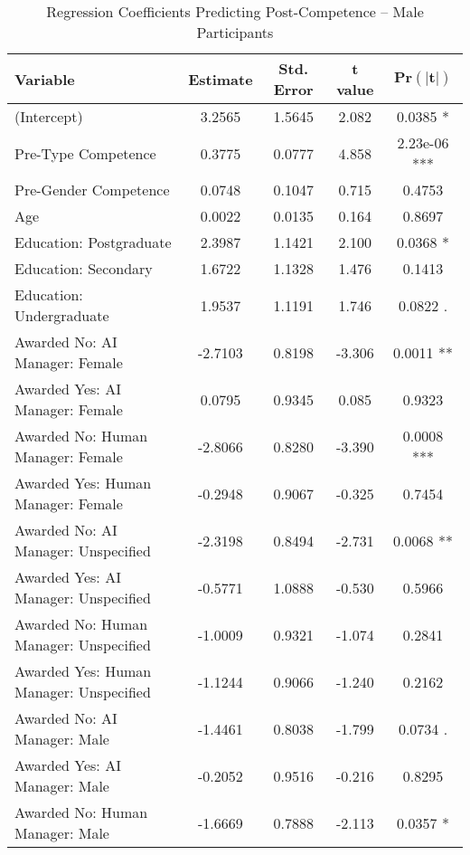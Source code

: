 \begin{table}[ht]
    \centering
    \caption{Regression Coefficients Predicting Post-Competence -- Male Participants}
    \begin{tabular}{lcccc}
        \toprule
        \textbf{Variable} & \textbf{Estimate} & \textbf{Std. Error} & \textbf{t value} & 
        $\mathbf{\text{Pr}(|t|)}$
        \\
        \midrule
        (Intercept) & 3.2565  & 1.5645  & 2.082  & 0.0385 *  \\
        Pre-Type Competence & 0.3775  & 0.0777  & 4.858  & 2.23e-06 ***  \\
        Pre-Gender Competence & 0.0748  & 0.1047  & 0.715  & 0.4753  \\
        Age & 0.0022  & 0.0135  & 0.164  & 0.8697  \\
        Education: Postgraduate & 2.3987  & 1.1421  & 2.100  & 0.0368 *  \\
        Education: Secondary & 1.6722  & 1.1328  & 1.476  & 0.1413  \\
        Education: Undergraduate & 1.9537  & 1.1191  & 1.746  & 0.0822 .  \\
        Awarded No: AI Manager: Female & -2.7103  & 0.8198  & -3.306  & 0.0011 **  \\
        Awarded Yes: AI Manager: Female & 0.0795  & 0.9345  & 0.085  & 0.9323  \\
        Awarded No: Human Manager: Female & -2.8066  & 0.8280  & -3.390  & 0.0008 ***  \\
        Awarded Yes: Human Manager: Female & -0.2948  & 0.9067  & -0.325  & 0.7454  \\
        Awarded No: AI Manager: Unspecified & -2.3198  & 0.8494  & -2.731  & 0.0068 **  \\
        Awarded Yes: AI Manager: Unspecified & -0.5771  & 1.0888  & -0.530  & 0.5966  \\
        Awarded No: Human Manager: Unspecified & -1.0009  & 0.9321  & -1.074  & 0.2841  \\
        Awarded Yes: Human Manager: Unspecified & -1.1244  & 0.9066  & -1.240  & 0.2162  \\
        Awarded No: AI Manager: Male & -1.4461  & 0.8038  & -1.799  & 0.0734 .  \\
        Awarded Yes: AI Manager: Male & -0.2052  & 0.9516  & -0.216  & 0.8295  \\
        Awarded No: Human Manager: Male & -1.6669  & 0.7888  & -2.113  & 0.0357 *  \\

\end{tabular}
\end{table}
